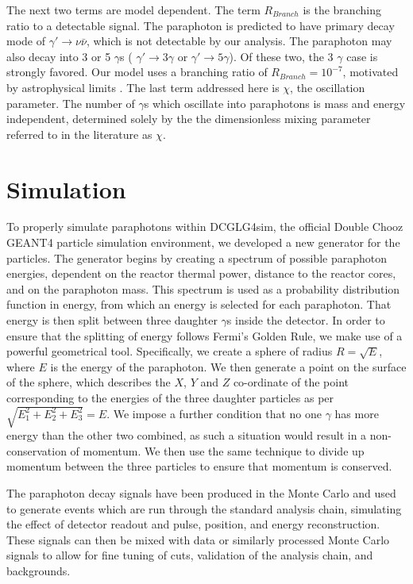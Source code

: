The next two terms are model dependent. The term $R_{Branch}$ is the branching ratio to a detectable signal. The paraphoton is predicted to have  primary decay mode of $\gamma \prime \rightarrow \nu \bar{\nu}$, which  is not detectable by our analysis. The paraphoton may also decay into 3 or 5 $\gamma$s ( $\gamma \prime \rightarrow 3 \gamma$ or $\gamma \prime \rightarrow 5 \gamma$).  Of these two, the 3 $\gamma$ case is strongly favored. Our model uses a branching ratio of $R_{Branch} = 10^{-7}$,  motivated by astrophysical limits \cite{Chris_Jones}. The last term addressed here is $\chi$, the oscillation parameter.  The number of $\gamma$s which oscillate into paraphotons is mass and energy independent, determined solely by the the dimensionless mixing parameter referred to in the literature as $\chi$.  


\section{Simulation}
To properly simulate paraphotons within DCGLG4sim, the official Double Chooz GEANT4 particle simulation environment, we developed a new generator for the particles. The generator begins by creating a spectrum of possible paraphoton energies, dependent on the reactor thermal power, distance to the reactor cores, and on the paraphoton mass. This spectrum is used as a probability distribution function in energy, from which an energy is selected for each paraphoton. That energy is then split between three daughter $\gamma$s inside the detector. In order to ensure that the splitting of energy follows Fermi's Golden Rule, we make use of a powerful geometrical tool. Specifically, we create a sphere of radius $R = \sqrt{E}$, where $E$ is the energy of the paraphoton. We then generate a point on the surface of the sphere, which describes the $X$, $Y$ and $Z$ co-ordinate of the point corresponding to the energies of the three daughter particles as per $\sqrt{E_1^2 + E_2^2 + E_3^2}  = E$. We impose a further condition that no one $\gamma$ has more energy than the other two combined, as such a situation would result in a non-conservation of momentum. We then use the same technique to divide up momentum between the three particles to ensure that momentum is conserved. 

The paraphoton decay signals have been produced in the Monte Carlo and used to generate events which are run through the standard analysis chain, simulating the effect of detector readout and pulse, position, and energy  reconstruction. These signals can then be mixed with  data or similarly processed Monte Carlo signals to allow for fine tuning of cuts, validation of the analysis chain, and backgrounds. 


